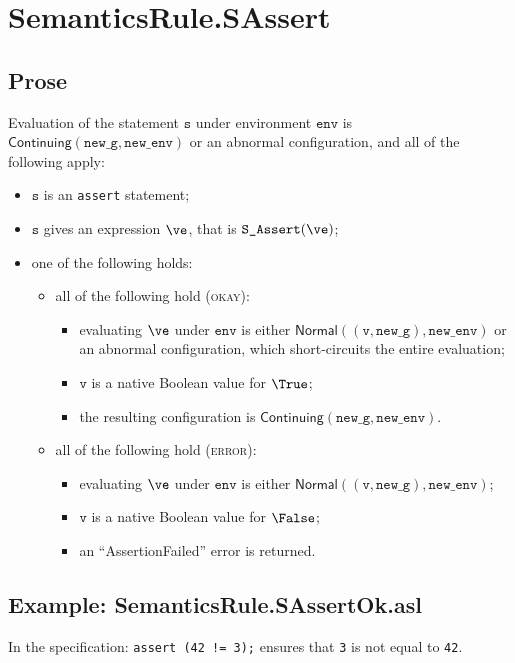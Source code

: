\documentclass{book}
\newcommand\ProseOrAbnormal[0]{or an abnormal configuration, which short-circuits the entire evaluation}
\newcommand\Normal[0]{\textsf{Normal}}
\newcommand\Continuing[0]{\textsf{Continuing}}
\newcommand\newenv[0]{\texttt{new\_env}}
\newcommand\env[0]{\texttt{env}}
\newcommand\newg[0]{\texttt{new\_g}}
\newcommand\vv[0]{\texttt{v}}
\newcommand\vs[0]{\texttt{s}}
\begin{document}

\section{SemanticsRule.SAssert \label{sec:SemanticsRule.SAssert}}
    \subsection{Prose}
    Evaluation of the statement $\vs$ under environment $\env$ is
    $\Continuing(\newg, \newenv)$ or an abnormal configuration,
    and all of the following apply:
    \begin{itemize}
      \item $\vs$ is an \texttt{assert} statement;
      \item $\vs$ gives an expression $\ve$, that is $\texttt{S\_Assert}(\ve)$;
      \item one of the following holds:
      \begin{itemize}
        \item all of the following hold (\textsc{okay}):
        \begin{itemize}
          \item evaluating $\ve$ under $\env$ is either $\Normal((\vv, \newg), \newenv)$
          \ProseOrAbnormal;
          \item $\vv$ is a native Boolean value for $\True$;
          \item the resulting configuration is $\Continuing(\newg, \newenv)$.
        \end{itemize}

        \item all of the following hold (\textsc{error}):
        \begin{itemize}
          \item evaluating $\ve$ under $\env$ is either $\Normal((\vv, \newg), \newenv)$;
          \item $\vv$ is a native Boolean value for $\False$;
          \item an ``AssertionFailed'' error is returned.
        \end{itemize}
      \end{itemize}
    \end{itemize}

    \subsection{Example: SemanticsRule.SAssertOk.asl}
    In the specification:
    \texttt{assert (42 != 3);} ensures that \texttt{3} is not equal to \texttt{42}.
\end{document}
